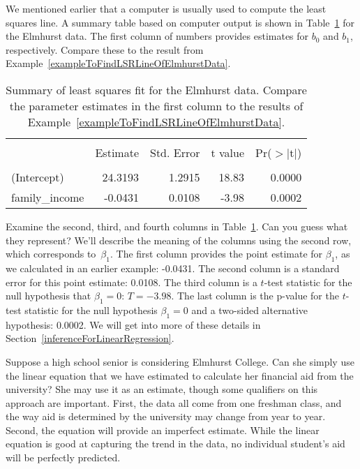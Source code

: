 We mentioned earlier that a computer is usually used to compute the least squares line. A summary table based on computer output is shown in Table~\ref{rOutputForIncomeAidLSRLine} for the Elmhurst data. The first column of numbers provides estimates for ${b}_0$ and ${b}_1$, respectively. Compare these to the result from Example~\ref{exampleToFindLSRLineOfElmhurstData}.

\begin{table}[ht]
\centering
\begin{tabular}{l rrrr}
  \hline
  \vspace{-3.7mm} & & & & \\
 & Estimate & Std. Error & t value & Pr($>$$|$t$|$) \\ 
  \hline
  \vspace{-3.6mm} & & & & \\
(Intercept) & 24.3193 & 1.2915 & 18.83 & 0.0000 \\ 
family\_\hspace{0.3mm}income & -0.0431 & 0.0108 & -3.98 & 0.0002 \\ 
  \hline
\end{tabular}
\caption{Summary of least squares fit for the Elmhurst data. Compare the parameter estimates in the first column to the results of Example~\ref{exampleToFindLSRLineOfElmhurstData}.}
\label{rOutputForIncomeAidLSRLine}
\end{table}

\begin{example}{Examine the second, third, and fourth columns in Table~\ref{rOutputForIncomeAidLSRLine}. Can you guess what they represent?}
We'll describe the meaning of the columns using the second row, which corresponds to~$\beta_1$. The first column provides the point estimate for $\beta_1$, as we calculated in an earlier example: -0.0431. The second column is a standard error for this point estimate: 0.0108. The third column is a $t$-test statistic for the null hypothesis that $\beta_1 = 0$: $T=-3.98$. The last column is the p-value for the $t$-test statistic for the null hypothesis $\beta_1=0$ and a two-sided alternative hypothesis: 0.0002. We will get into more of these details in Section~\ref{inferenceForLinearRegression}.
\end{example}

\begin{example}{Suppose a high school senior is considering Elmhurst College. Can she simply use the linear equation that we have estimated to calculate her financial aid from the university?}
She may use it as an estimate, though some qualifiers on this approach are important. First, the data all come from one freshman class, and the way aid is determined by the university may change from year to year. Second, the equation will provide an imperfect estimate. While the linear equation is good at capturing the trend in the data, no individual student's aid will be perfectly predicted.
\end{example} 

